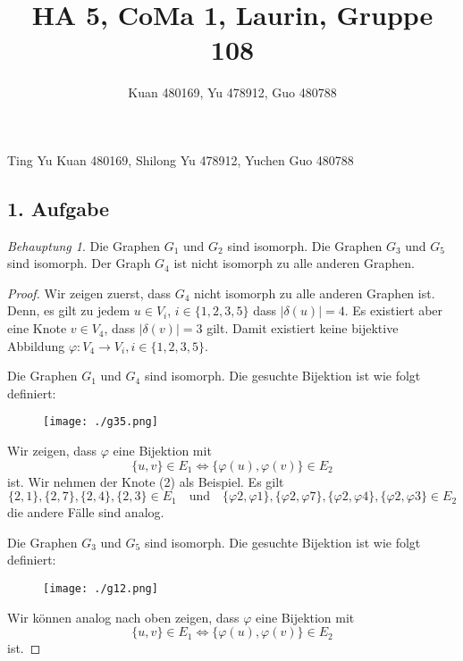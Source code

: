 \documentclass[a5paper]{article}
\title{HA 5, CoMa 1, Laurin, Gruppe 108}
\author{Kuan 480169, Yu 478912, Guo 480788}
\providecommand{\abs}[1]{\left\lvert#1\right\rvert}
\theoremstyle{remark}
\newtheorem*{Behauptung}{Behauptung}
\begin{document}
\maketitle
\begin{center}
Ting Yu Kuan 480169, Shilong Yu 478912, Yuchen Guo 480788
\end{center}
\newpage
\subsection{1. Aufgabe}
\begin{Behauptung}
  Die Graphen \(G_{1}\) und \(G_{2}\) sind isomorph.  Die Graphen \(G_{3}\)
  und \(G_{5}\) sind isomorph.  Der Graph \(G_{4}\) ist nicht isomorph zu
  alle anderen Graphen.
\end{Behauptung}
\begin{proof}
Wir zeigen zuerst, dass \(G_{4}\) nicht isomorph zu alle anderen Graphen
ist.  Denn, es gilt zu jedem \(u \in V_{i}\), \(i \in \{1, 2, 3, 5\}\) dass
\(\abs{\delta(u)} = 4\).  Es existiert aber eine Knote \(v \in V_{4}\), dass
\(\abs{\delta(v)} = 3\) gilt.  Damit existiert keine bijektive Abbildung
\(\varphi\colon V_{4} \to V_{i}, i \in \{1, 2, 3, 5\}\).

Die Graphen \(G_{1}\) und \(G_{4}\) sind isomorph.  Die gesuchte Bijektion
ist wie folgt definiert:
\begin{figure}[h]
  \centering
  \texttt{[image: ./g35.png]}
\end{figure}

Wir zeigen, dass \(\varphi\) eine Bijektion mit \[\{u, v\} \in E_{1} \Leftrightarrow \{\varphi(u),
  \varphi(v)\} \in E_{2}\]
ist.  Wir nehmen der Knote (2) als Beispiel.  Es gilt
\[\{2,1\}, \{2,7\}, \{2,4\}, \{2, 3\} \in E_{1} \quad \text{und} \quad
  \{\varphi2,\varphi1\}, \{\varphi2,\varphi7\}, \{\varphi2,\varphi4\}, \{\varphi2, \varphi3\} \in E_{2}\]
die andere Fälle sind analog.

Die Graphen \(G_{3}\) und \(G_{5}\) sind isomorph.  Die gesuchte Bijektion
ist wie folgt definiert:
\begin{figure}[h]
  \centering
  \texttt{[image: ./g12.png]}
\end{figure}

Wir können analog nach oben zeigen, dass \(\varphi\) eine Bijektion mit \[\{u, v\} \in E_{1} \Leftrightarrow \{\varphi(u),
  \varphi(v)\} \in E_{2}\]
ist.
\end{proof}
\end{document}
